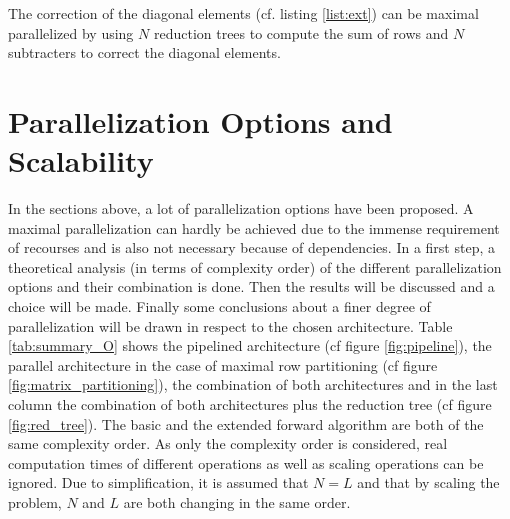 \documentclass[mscthesis]{usiinfthesis}
\begin{document}
The correction of the diagonal elements (cf. listing \ref{list:ext}) can be
maximal parallelized by using $N$ reduction trees to compute the sum of rows and
$N$ subtracters to correct the diagonal elements.

\section{Parallelization Options and Scalability}
\label{ch:analysis_all}

In the sections above, a lot of parallelization options have been proposed.
A maximal parallelization can hardly be achieved due to the immense requirement
of recourses and is also not necessary because of dependencies. In a first
step, a theoretical analysis (in terms of complexity order) of the different
parallelization options and their combination is done. Then the results will be
discussed and a choice will be made. Finally some conclusions about a finer
degree of parallelization will be drawn in respect to the chosen architecture.
Table \ref{tab:summary_O} shows the pipelined architecture (cf figure
\ref{fig:pipeline}), the parallel architecture in the case of maximal row
partitioning (cf figure \ref{fig:matrix_partitioning}), the combination of
both architectures and in the last column the combination of both architectures
plus the reduction tree (cf figure \ref{fig:red_tree}). The basic and the
extended forward algorithm are both of the same complexity order. As only the
complexity order is considered, real computation times of different operations
as well as scaling operations can be ignored. Due to simplification, it is
assumed that $N=L$ and that by scaling the problem, $N$ and $L$ are both
changing in the same order.
\end{document}
